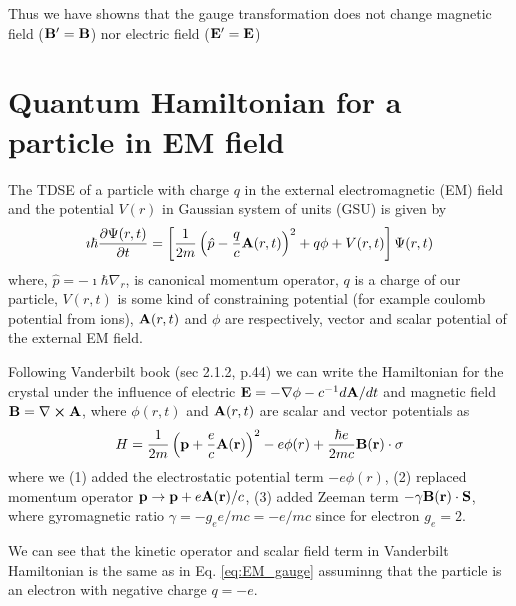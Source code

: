 \documentclass[11pt]{article}
\begin{document}
Thus we have showns that the  gauge transformation  does not change magnetic field  ($\vb  B'=  \vb  B$)  nor   electric  field ($\vb  E'=  \vb  E$) 






\section{Quantum  Hamiltonian  for  a particle in  EM field }


The TDSE of a particle with charge $q$ in the external electromagnetic (EM) field and the potential $V(r)$  in Gaussian system of units (GSU) is given by
\begin{align}
\imath \hbar \pdv{\Psi(r,t)}{t} = \left[  \frac{1}{2m} \left(\hat p -\frac{q}{c} \vb A(r,t) \right)^2 + q\phi +V(r,t)  \right]\Psi(r,t)
\label{eq:EM_gauge}
\end{align}
where, $\hat p=-\imath \hbar\nabla_r$, is canonical momentum operator, $q$ is a charge of our particle, $V(r,t)$ is  some kind of constraining potential (for example coulomb potential from ions), $\vb A(r,t)$ and $\phi$ are respectively,    vector  and scalar potential   of the external  EM field.


Following  Vanderbilt book \cite{Vanderbilt-book} (sec 2.1.2, p.44) we can  write the Hamiltonian for    
the  crystal  under the influence of electric $\vb E = -\nabla \phi  -c^{-1} d \vb A/dt$ and magnetic field  $\vb B = \nabla \cross \vb A$, where $\phi(r,t)$ and $\vb A(r,t)$ are scalar and vector potentials as 
\begin{align}
    H = \frac{1}{2m} \left( \vb p  + \frac{e}{c} \vb{ A(r)} \right) ^2  - e \phi(r)  + \frac{\hbar e }{2mc}  \vb{B(r) \cdot \sigma} 
\end{align}
where we (1) added the electrostatic potential term   $-e \phi(r)$, (2) replaced momentum  operator $\vb p \to \vb p + e \vb{A(r)} /c $,  (3) added Zeeman term
$ -\gamma \vb{B(r) \cdot S }$, where  gyromagnetic   ratio $\gamma = -g_e e /mc = -e/mc $ since for electron $g_e=2$. 

We can see that the kinetic operator and scalar field  term  in  Vanderbilt Hamiltonian is the same  as  in Eq. \ref{eq:EM_gauge} assuminng  that  the particle is an electron with negative charge  $q=-e$.
\end{document}
